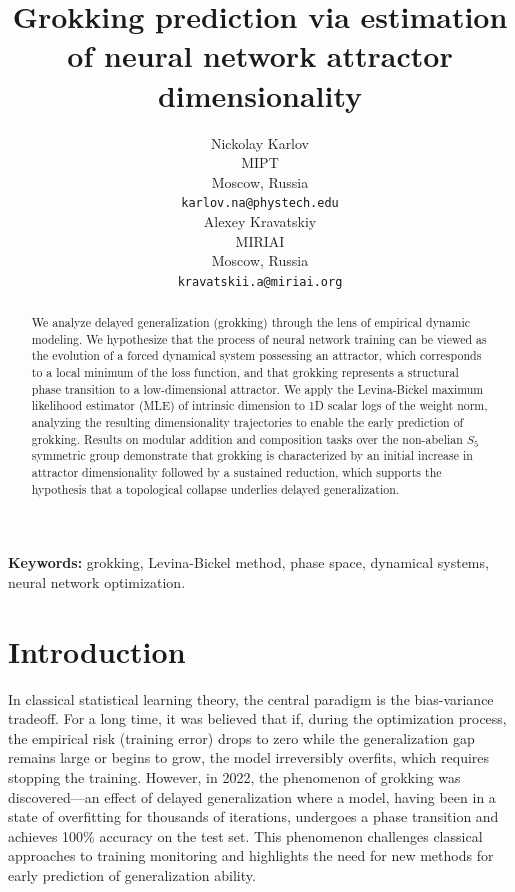 \documentclass{article}
\title{Grokking prediction via estimation of neural network attractor dimensionality}
\author{
  Nickolay Karlov\\
  MIPT\\
  Moscow, Russia\\
  \texttt{karlov.na@phystech.edu}\\
  \And
  Alexey Kravatskiy\\
  MIRIAI\\
  Moscow, Russia\\
  \texttt{kravatskii.a@miriai.org}\\
}
\begin{document}
\maketitle

\begin{abstract}
    We analyze delayed generalization (grokking) through the lens of empirical dynamic modeling. We hypothesize that the process of neural network training can be viewed as the evolution of a forced dynamical system possessing an attractor, which corresponds to a local minimum of the loss function, and that grokking represents a structural phase transition to a low-dimensional attractor. We apply the Levina-Bickel maximum likelihood estimator (MLE) of intrinsic dimension to 1D scalar logs of the weight norm, analyzing the resulting dimensionality trajectories to enable the early prediction of grokking. Results on modular addition and composition tasks over the non-abelian  $S_5$ symmetric group demonstrate that grokking is characterized by an initial increase in attractor dimensionality followed by a sustained reduction, which supports the hypothesis that a topological collapse underlies delayed generalization.
\end{abstract}

\textbf{Keywords:} grokking, Levina-Bickel method, phase space, dynamical systems, neural network optimization.


\section{Introduction}\label{sec:intro}

In classical statistical learning theory, the central paradigm is the bias-variance tradeoff. For a long time, it was believed that if, during the optimization process, the empirical risk (training error) drops to zero while the generalization gap remains large or begins to grow, the model irreversibly overfits, which requires stopping the training. However, in 2022, the phenomenon of grokking \cite{power2022grokking} was discovered—an effect of delayed generalization where a model, having been in a state of overfitting for thousands of iterations, undergoes a phase transition and achieves 100\% accuracy on the test set. This phenomenon challenges classical approaches to training monitoring and highlights the need for new methods for early prediction of generalization ability.
\end{document}
